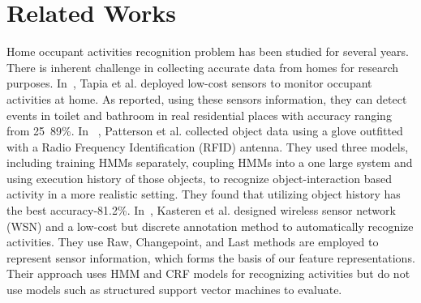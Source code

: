 \section{Related Works}

Home occupant activities recognition problem has been studied for several years. There is inherent challenge in collecting accurate data from homes for research purposes. In~\cite{emtapia}, Tapia et al. deployed low-cost sensors to monitor occupant activities at home. As reported, using these sensors information, they can detect events in toilet and bathroom in real residential places with accuracy ranging from 25~89\%. In ~\cite{djpatt}, Patterson et al. collected object data using a glove outfitted with a Radio Frequency Identification (RFID) antenna. They used three models, including training HMMs separately, coupling HMMs into a one large system and using execution history of those objects, to recognize object-interaction based activity in a more realistic setting. They found that utilizing object history has the best accuracy-81.2\%. In~\cite{tvkasteren}, Kasteren et al. designed  wireless sensor network (WSN) and a low-cost but discrete annotation method to automatically recognize activities. They use Raw, Changepoint, and Last methods are employed to represent sensor information, which forms the basis of our feature representations. Their approach uses HMM and CRF models for recognizing activities but do not use models such as structured support vector machines to evaluate. 

